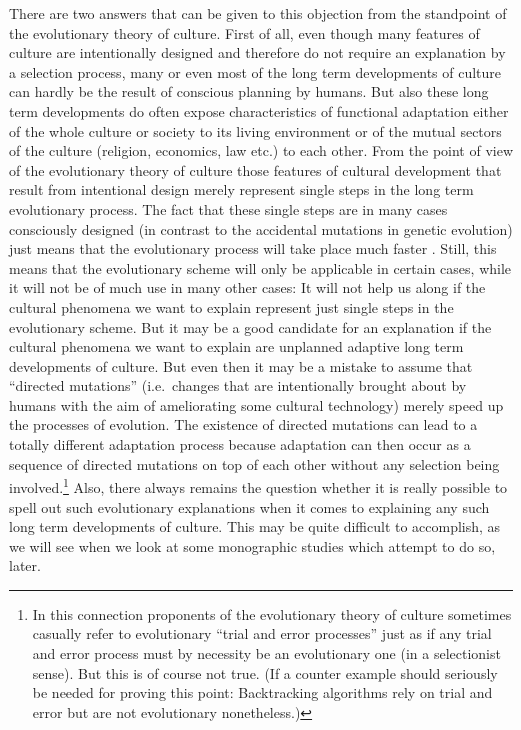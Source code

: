 There are two answers that can be given to this objection from the standpoint
of the evolutionary theory of culture. First of all, even though many features
of culture are intentionally designed and therefore do not require an
explanation by a selection process, many or even most of the long term
developments of culture can hardly be the result of conscious planning by
humans. But also these long term developments do often expose characteristics
of functional adaptation either of the whole culture or society to its living
environment or of the mutual sectors of the culture (religion, economics, law
etc.) to each other.  From the point of view of the evolutionary theory of
culture those features of cultural development that result from intentional
design merely represent single steps in the long term evolutionary process.
The fact that these single steps are in many cases consciously designed (in
contrast to the accidental mutations in genetic evolution) just means that the
evolutionary process will take place much faster \cite[p.\ 345]{schurz:2001}
\cite[p.\ 66]{cavalli-sforza-feldman:1981}.  Still, this means that the
evolutionary scheme will only be applicable in certain cases, while it will
not be of much use in many other cases: It will not help us along if the
cultural phenomena we want to explain represent just single steps in the
evolutionary scheme. But it may be a good candidate for an explanation if the
cultural phenomena we want to explain are unplanned adaptive long term
developments of culture. But even then it may be a mistake to assume that
``directed mutations'' (i.e.\ changes that are intentionally brought about by
humans with the aim of ameliorating some cultural technology) merely speed up
the processes of evolution.  The existence of directed mutations can lead to a
totally different adaptation process because adaptation can then occur as a
sequence of directed mutations on top of each other without any selection
being involved.\footnote{In this connection proponents of the evolutionary
  theory of culture sometimes casually refer to evolutionary ``trial and error
  processes'' just as if any trial and error process must by necessity be an
  evolutionary one (in a selectionist sense). But this is of course not true.
  (If a counter example should seriously be needed for proving this point:
  Backtracking algorithms rely on trial and error but are not evolutionary
  nonetheless.)} Also, there always remains the question whether it is really
possible to spell out such evolutionary explanations when it comes to
explaining any such long term developments of culture. This may be quite
difficult to accomplish, as we will see when we look at some monographic
studies which attempt to do so, later.


